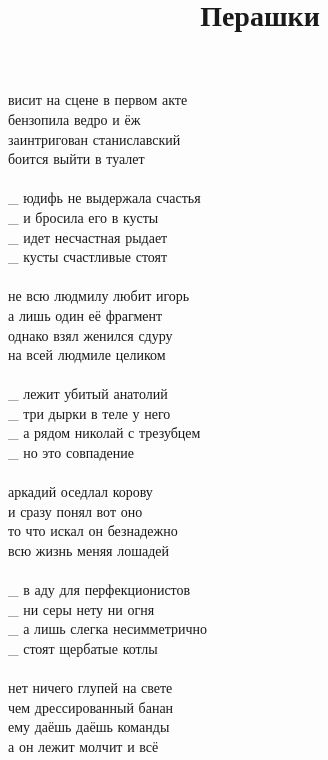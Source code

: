 \documentclass{article}
\author{}
\title{Перашки}
\date{}
\begin{document}
\maketitle

\begin{Verse}
висит на сцене в первом акте\\
бензопила ведро и ёж\\
заинтригован станиславский\\
боится выйти в туалет\\
\\
\_ юдифь не выдержала счастья\\
\_ и бросила его в кусты\\
\_ идет несчастная рыдает\\
\_ кусты счастливые стоят\\
\\
не всю людмилу любит игорь\\
а лишь один её фрагмент\\
однако взял женился сдуру\\
на всей людмиле целиком\\
\\
\_ лежит убитый анатолий\\
\_ три дырки в теле у него\\
\_ а рядом николай с трезубцем\\
\_ но это совпадение\\
\\
аркадий оседлал корову\\
и сразу понял вот оно\\
то что искал он безнадежно\\
всю жизнь меняя лошадей\\
\\
\_ в аду для перфекционистов\\
\_ ни серы нету ни огня\\
\_ а лишь слегка несимметрично\\
\_ стоят щербатые котлы\\
\\
нет ничего глупей на свете\\
чем дрессированный банан\\
ему даёшь даёшь команды\\
а он лежит молчит и всё\\
\end{Verse}
\end{document}
